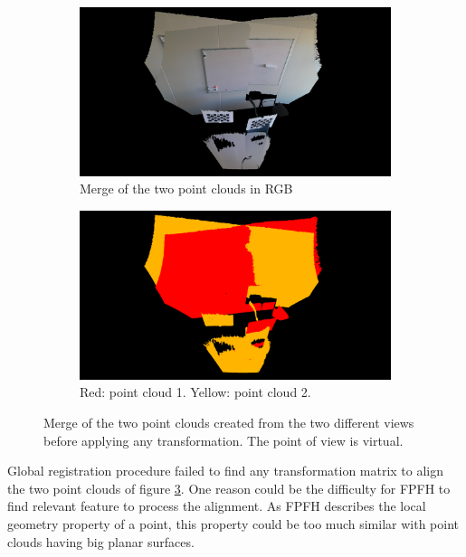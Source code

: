 \begin{figure}[H]
\centering
  \begin{subfigure}[b]{0.48 \textwidth}
    \includegraphics[width=\textwidth]{images/registration/pc_raw_static_merged_rgb.png}
    \caption{Merge of the two point clouds in RGB}
    \label{figure:pc_raw_static_merged_rgb}
  \end{subfigure}
  \hfill
  \begin{subfigure}[b]{0.48 \textwidth}
    \includegraphics[width=\textwidth]{images/registration/pc_raw_static_merged_color.png}
    \caption{Red: point cloud 1. Yellow: point cloud 2.}
    \label{figure:pc_raw_static_merged_color}
  \end{subfigure}
  \caption{Merge of the two point clouds created from the two different views before applying any transformation. The point of view is virtual.}
  \label{figure:pc_raw_static_merged}
\end{figure}

Global registration procedure failed to find any transformation matrix to align the two point clouds of figure \ref{figure:pc_raw_static_merged}. One  reason could be the difficulty for FPFH to find relevant feature to process the alignment. As FPFH describes the local geometry property of a point, this property could be too much similar with point clouds having big planar surfaces.

